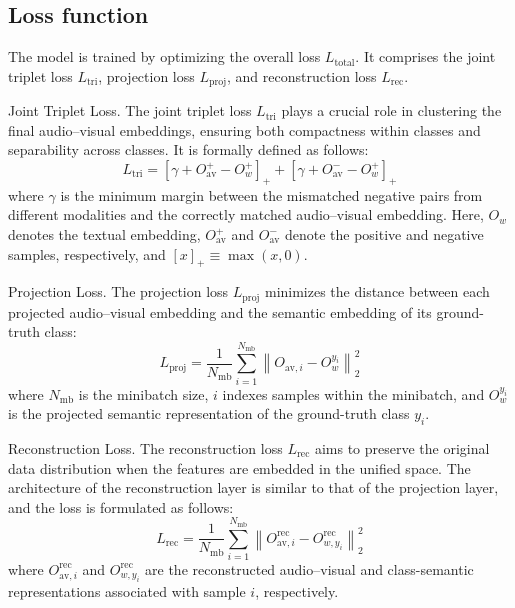 \documentclass[lettersize,journal]{IEEEtran}
\begin{document}
\subsection{Loss function}
The model is trained by optimizing the overall loss $L_{\mathrm{total}}$. It comprises the joint triplet loss $L_{\mathrm{tri}}$, projection loss $L_{\mathrm{proj}}$, and reconstruction loss $L_{\mathrm{rec}}$.


Joint Triplet Loss. The joint triplet loss $L_{\mathrm{tri}}$ plays a crucial role in clustering the final audio–visual embeddings, ensuring both compactness within classes and separability across classes. It is formally defined as follows:
\begin{equation}
L_{\mathrm{tri}} = \left[ \gamma + O_{\text{av}}^+ - O_w^+ \right]_+ + \left[ \gamma + O_{\text{av}}^- - O_w^+ \right]_+
\end{equation}
where $\gamma$ is the minimum margin between the mismatched negative pairs from different modalities and the correctly matched audio–visual embedding. Here, $O_w$ denotes the textual embedding, $O_{\text{av}}^+$ and $O_{\text{av}}^-$ denote the positive and negative samples, respectively, and $\left[ x \right]_+ \equiv \max(x,0)$.


Projection Loss. The projection loss $L_{\mathrm{proj}}$ minimizes the distance between each projected audio--visual embedding and the semantic embedding of its ground-truth class:
\begin{equation}
L_{\mathrm{proj}}=\frac{1}{N_{\mathrm{mb}}}\sum_{i=1}^{N_{\mathrm{mb}}}
\left\|O_{\mathrm{av},i}-O_w^{y_i}\right\|_2^2
\end{equation}
where $N_{\mathrm{mb}}$ is the minibatch size, $i$ indexes samples within the minibatch, and $O_w^{y_i}$ is the projected semantic representation of the ground-truth class $y_i$.


Reconstruction Loss. The reconstruction loss $L_{\mathrm{rec}}$ aims to preserve the original data distribution when the features are embedded in the unified space. The architecture of the reconstruction layer is similar to that of the projection layer, and the loss is formulated as follows:
\begin{equation}
L_{\mathrm{rec}}=\frac{1}{N_{\mathrm{mb}}}\sum_{i=1}^{N_{\mathrm{mb}}}
\left\|O_{\mathrm{av},i}^{\mathrm{rec}}-O_{w,y_i}^{\mathrm{rec}}\right\|_2^2
\end{equation}
where $O_{\mathrm{av},i}^{\mathrm{rec}}$ and $O_{w,y_i}^{\mathrm{rec}}$ are the reconstructed audio--visual and class-semantic representations associated with sample $i$, respectively.
\end{document}
